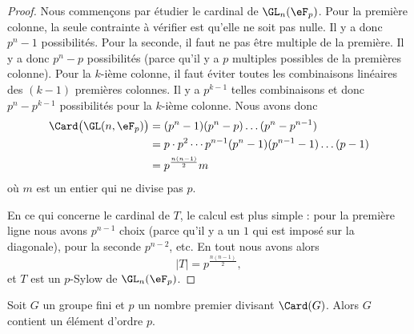 \begin{proof}
	Nous commençons par étudier le cardinal de \( \GL_n(\eF_p)\). Pour la première colonne, la seule contrainte à vérifier est qu'elle ne soit pas nulle. Il y a donc \( p^n-1\) possibilités. Pour la seconde, il faut ne pas être multiple de la première. Il y a donc \( p^n-p\) possibilités (parce qu'il y a \( p\) multiples possibles de la premières colonne). Pour la \( k\)-ième colonne, il faut éviter toutes les combinaisons linéaires des \( (k-1)\) premières colonnes. Il y a \( p^{k-1}\) telles combinaisons et donc \( p^n-p^{k-1}\) possibilités pour la \( k\)-ième colonne. Nous avons donc
	\begin{subequations}
		\begin{align}
			\Card\big( \GL(n,\eF_{p}) \big) & =(p^n-1)(p^n-p)\ldots(p^n-p^{n-1})                      \\
			                                & =p\cdot p^2\cdots p^{n-1}(p^n-1)(p^{n-1}-1)\ldots (p-1) \\
			                                & =p^{\frac{ n(n-1) }{2}}m
		\end{align}
	\end{subequations}
	où \( m\) est un entier qui ne divise pas \( p\).

	En ce qui concerne le cardinal de \( T\), le calcul est plus simple : pour la première ligne nous avons \( p^{n-1}\) choix (parce qu'il y a un \( 1\) qui est imposé sur la diagonale), pour la seconde \( p^{n-2}\), etc. En tout nous avons alors
	\begin{equation}
		| T |=p^{\frac{ n(n-1) }{2}},
	\end{equation}
	et \( T\) est un \( p\)-Sylow de \( \GL_n(\eF_p)\).
\end{proof}





\begin{theorem}\label{ThoCauchyGpFini}
	Soit \( G\) un groupe fini et \( p\) un nombre premier divisant \( \Card(G)\). Alors \( G\) contient un élément d'ordre \( p\).
\end{theorem}

